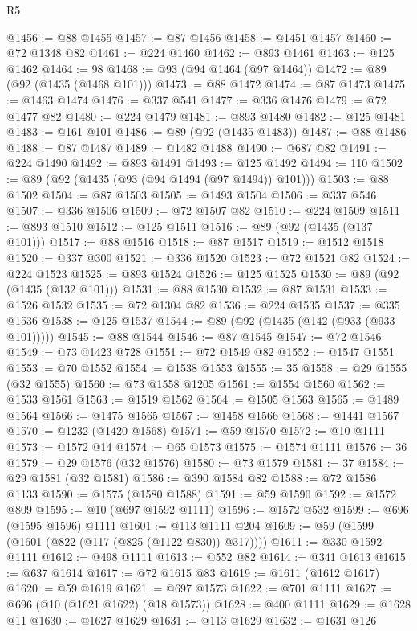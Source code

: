 \begin{lexlean}{R5}
\begin{coremodule}
@1456 := @88 @1455
@1457 := @87 @1456
@1458 := @1451 @1457
@1460 := @72 @1348 @82
@1461 := @224 @1460
@1462 := @893 @1461
@1463 := @125 @1462
@1464 := 98
@1468 := @93 (@94 @1464 (@97 @1464))
@1472 := @89 (@92 (@1435 (@1468 @101)))
@1473 := @88 @1472
@1474 := @87 @1473
@1475 := @1463 @1474
@1476 := @337 @541
@1477 := @336 @1476
@1479 := @72 @1477 @82
@1480 := @224 @1479
@1481 := @893 @1480
@1482 := @125 @1481
@1483 := @161 @101
@1486 := @89 (@92 (@1435 @1483))
@1487 := @88 @1486
@1488 := @87 @1487
@1489 := @1482 @1488
@1490 := @687 @82
@1491 := @224 @1490
@1492 := @893 @1491
@1493 := @125 @1492
@1494 := 110
@1502 := @89 (@92 (@1435 (@93 (@94 @1494 (@97 @1494)) @101)))
@1503 := @88 @1502
@1504 := @87 @1503
@1505 := @1493 @1504
@1506 := @337 @546
@1507 := @336 @1506
@1509 := @72 @1507 @82
@1510 := @224 @1509
@1511 := @893 @1510
@1512 := @125 @1511
@1516 := @89 (@92 (@1435 (@137 @101)))
@1517 := @88 @1516
@1518 := @87 @1517
@1519 := @1512 @1518
@1520 := @337 @300
@1521 := @336 @1520
@1523 := @72 @1521 @82
@1524 := @224 @1523
@1525 := @893 @1524
@1526 := @125 @1525
@1530 := @89 (@92 (@1435 (@132 @101)))
@1531 := @88 @1530
@1532 := @87 @1531
@1533 := @1526 @1532
@1535 := @72 @1304 @82
@1536 := @224 @1535
@1537 := @335 @1536
@1538 := @125 @1537
@1544 := @89 (@92 (@1435 (@142 (@933 (@933 @101)))))
@1545 := @88 @1544
@1546 := @87 @1545
@1547 := @72 @1546
@1549 := @73 @1423 @728
@1551 := @72 @1549 @82
@1552 := @1547 @1551
@1553 := @70 @1552
@1554 := @1538 @1553
@1555 := 35
@1558 := @29 @1555 (@32 @1555)
@1560 := @73 @1558 @1205
@1561 := @1554 @1560
@1562 := @1533 @1561
@1563 := @1519 @1562
@1564 := @1505 @1563
@1565 := @1489 @1564
@1566 := @1475 @1565
@1567 := @1458 @1566
@1568 := @1441 @1567
@1570 := @1232 (@1420 @1568)
@1571 := @59 @1570
@1572 := @10 @1111
@1573 := @1572 @14
@1574 := @65 @1573
@1575 := @1574 @1111
@1576 := 36
@1579 := @29 @1576 (@32 @1576)
@1580 := @73 @1579
@1581 := 37
@1584 := @29 @1581 (@32 @1581)
@1586 := @390 @1584 @82
@1588 := @72 @1586 @1133
@1590 := @1575 (@1580 @1588)
@1591 := @59 @1590
@1592 := @1572 @809
@1595 := @10 (@697 @1592 @1111)
@1596 := @1572 @532
@1599 := @696 (@1595 @1596) @1111
@1601 := @113 @1111 @204
@1609 := @59 (@1599 (@1601 (@822 (@117 (@825 (@1122 @830)) @317))))
@1611 := @330 @1592 @1111
@1612 := @498 @1111
@1613 := @552 @82
@1614 := @341 @1613
@1615 := @637 @1614
@1617 := @72 @1615 @83
@1619 := @1611 (@1612 @1617)
@1620 := @59 @1619
@1621 := @697 @1573
@1622 := @701 @1111
@1627 := @696 (@10 (@1621 @1622) (@18 @1573))
@1628 := @400 @1111
@1629 := @1628 @11
@1630 := @1627 @1629
@1631 := @113 @1629
@1632 := @1631 @126

\end{coremodule}
\end{lexlean}
